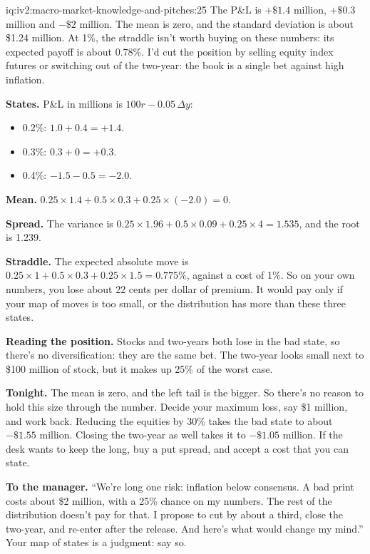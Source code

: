 \begin{solution}{iq:iv2:macro-market-knowledge-and-pitches:25}
The P\&L is $+\$1.4$ million, $+\$0.3$ million and $-\$2$ million. The mean is zero, and the standard deviation is about \$1.24 million. At 1\%, the straddle isn't worth buying on these numbers: its expected payoff is about 0.78\%. I'd cut the position by selling equity index futures or switching out of the two-year: the book is a single bet against high inflation.

\textbf{States.} P\&L in millions is $100r - 0.05\,\Delta y$:
\begin{itemize}
\item 0.2\%: $1.0 + 0.4 = +1.4$.
\item 0.3\%: $0.3 + 0 = +0.3$.
\item 0.4\%: $-1.5 - 0.5 = -2.0$.
\end{itemize}

\textbf{Mean.} $0.25 \times 1.4 + 0.5 \times 0.3 + 0.25 \times (-2.0) = 0$.

\textbf{Spread.} The variance is $0.25 \times 1.96 + 0.5 \times 0.09 + 0.25 \times 4 = 1.535$, and the root is 1.239.

\textbf{Straddle.} The expected absolute move is $0.25 \times 1 + 0.5 \times 0.3 + 0.25 \times 1.5 = 0.775\%$, against a cost of 1\%. So on your own numbers, you lose about 22 cents per dollar of premium. It would pay only if your map of moves is too small, or the distribution has more than these three states.

\textbf{Reading the position.} Stocks and two-years both lose in the bad state, so there's no diversification: they are the same bet. The two-year looks small next to \$100 million of stock, but it makes up 25\% of the worst case.

\textbf{Tonight.} The mean is zero, and the left tail is the bigger. So there's no reason to hold this size through the number. Decide your maximum loss, say \$1 million, and work back. Reducing the equities by 30\% takes the bad state to about $-\$1.55$ million. Closing the two-year as well takes it to $-\$1.05$ million. If the desk wants to keep the long, buy a put spread, and accept a cost that you can state.

\textbf{To the manager.} ``We're long one risk: inflation below consensus. A bad print costs about \$2 million, with a 25\% chance on my numbers. The rest of the distribution doesn't pay for that. I propose to cut by about a third, close the two-year, and re-enter after the release. And here's what would change my mind.'' Your map of states is a judgment: say so.

\end{solution}
